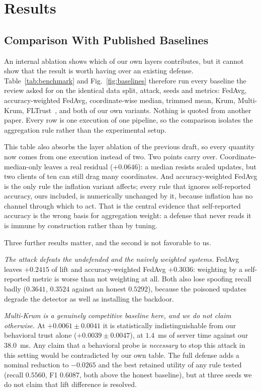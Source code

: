 \documentclass[journal]{IEEEtran}
\begin{document}
\section{Results}

\subsection{Comparison With Published Baselines}
\label{subsec:benchmark}
An internal ablation shows which of our own layers contributes, but it cannot show that the result is worth having over an existing defense. Table~\ref{tab:benchmark} and Fig.~\ref{fig:baselines} therefore run every baseline the review asked for on the identical data split, attack, seeds and metrics: FedAvg, accuracy-weighted FedAvg, coordinate-wise median, trimmed mean, Krum, Multi-Krum, FLTrust~\cite{cao2021fltrust}, and both of our own variants. Nothing is quoted from another paper. Every row is one execution of one pipeline, so the comparison isolates the aggregation rule rather than the experimental setup.

This table also absorbs the layer ablation of the previous draft, so every
quantity now comes from one execution instead of two. Two points carry over.
Coordinate-median-only leaves a real residual ($+0.0646$): a median resists
scaled updates, but two clients of ten can still drag many coordinates. And
accuracy-weighted FedAvg is the only rule the inflation variant affects; every
rule that ignores self-reported accuracy, ours included, is numerically
unchanged by it, because inflation has no channel through which to act. That is
the central evidence that self-reported accuracy is the wrong basis for
aggregation weight: a defense that never reads it is immune by construction
rather than by tuning.

Three further results matter, and the second is not favorable to us.

\textit{The attack defeats the undefended and the naively weighted systems.} FedAvg leaves $+0.2415$ of lift and accuracy-weighted FedAvg $+0.3036$: weighting by a self-reported metric is worse than not weighting at all. Both also lose spoofing recall badly ($0.3641$, $0.3524$ against an honest $0.5292$), because the poisoned updates degrade the detector as well as installing the backdoor.

\textit{Multi-Krum is a genuinely competitive baseline here, and we do not claim otherwise.} At $+0.0061 \pm 0.0041$ it is statistically indistinguishable from our behavioral trust alone ($+0.0039 \pm 0.0047$), at $1.4$~ms of server time against our $38.0$~ms. Any claim that a behavioral probe is \emph{necessary} to stop this attack in this setting would be contradicted by our own table. The full defense adds a nominal reduction to $-0.0265$ and the best retained utility of any rule tested (recall $0.5560$, F1 $0.6087$, both above the honest baseline), but at three seeds we do not claim that lift difference is resolved.
\end{document}
